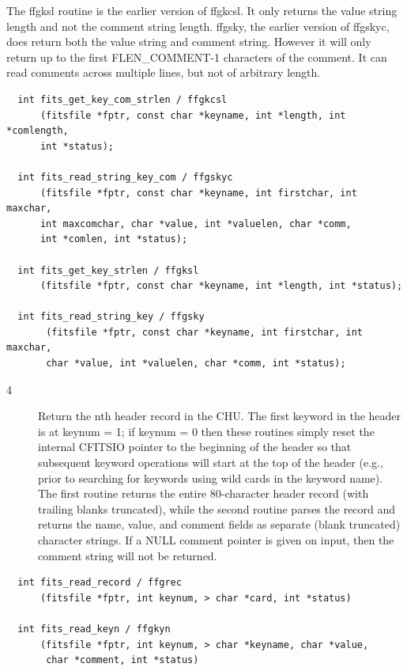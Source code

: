 \documentclass[11pt]{book}
\begin{document}
\begin{description}
    The ffgksl routine is the earlier version of ffgkcsl. It only returns the value string length and
    not the comment string length.  ffgsky, the earlier version of ffgskyc, does return 
    both the value string and comment string.  However it will only return up to the
    first FLEN\_COMMENT-1 characters of the comment.  It can read comments across
    multiple lines, but not of arbitrary length.   \label{ffgkcsl} \label{ffgskyc} \label{ffgksl} \label{ffgsky}
\end{description}

\begin{verbatim}
  int fits_get_key_com_strlen / ffgkcsl
      (fitsfile *fptr, const char *keyname, int *length, int *comlength,
      int *status);
      
  int fits_read_string_key_com / ffgskyc
      (fitsfile *fptr, const char *keyname, int firstchar, int maxchar,
      int maxcomchar, char *value, int *valuelen, char *comm,
      int *comlen, int *status);
      
  int fits_get_key_strlen / ffgksl
      (fitsfile *fptr, const char *keyname, int *length, int *status);

  int fits_read_string_key / ffgsky
       (fitsfile *fptr, const char *keyname, int firstchar, int maxchar,
       char *value, int *valuelen, char *comm, int *status);
\end{verbatim}

\begin{description}
\item[4 ] Return the nth header record in the CHU.  The first keyword
   in the header is at keynum = 1;  if keynum = 0 then these routines
   simply reset the internal CFITSIO pointer to the beginning of the header
   so that subsequent keyword operations will start at the top of the
   header (e.g., prior to searching for keywords using wild cards in
   the keyword name).   The first routine returns the entire
   80-character header record (with trailing blanks truncated),
   while the second routine parses the record and returns the name,
   value, and comment fields as separate (blank truncated)
   character strings.  If a NULL comment pointer is given on input,
   then the comment string will not be
  returned. \label{ffgrec} \label{ffgkyn}
\end{description}

\begin{verbatim}
  int fits_read_record / ffgrec
      (fitsfile *fptr, int keynum, > char *card, int *status)

  int fits_read_keyn / ffgkyn
      (fitsfile *fptr, int keynum, > char *keyname, char *value,
       char *comment, int *status)
\end{verbatim}
\end{document}
